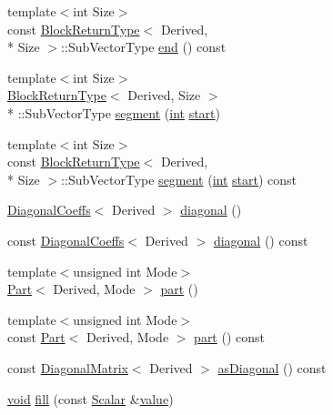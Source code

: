 \begin{DoxyCompactItemize}
\item 
{\footnotesize template$<$int Size$>$ }\\const \hyperlink{struct_block_return_type}{Block\-Return\-Type}$<$ Derived, \\*
Size $>$\-::Sub\-Vector\-Type \hyperlink{class_matrix_base_a66719213d51d4794bd0245740b1d8588}{end} () const 
\item 
{\footnotesize template$<$int Size$>$ }\\\hyperlink{struct_block_return_type}{Block\-Return\-Type}$<$ Derived, Size $>$\\*
\-::Sub\-Vector\-Type \hyperlink{class_matrix_base_a2531b5529eeddd274b4d51ecc45c0691}{segment} (\hyperlink{ioapi_8h_a787fa3cf048117ba7123753c1e74fcd6}{int} \hyperlink{glext_8h_a13be19455586e95d5a42ed8f054afad2}{start})
\item 
{\footnotesize template$<$int Size$>$ }\\const \hyperlink{struct_block_return_type}{Block\-Return\-Type}$<$ Derived, \\*
Size $>$\-::Sub\-Vector\-Type \hyperlink{class_matrix_base_aff2b2f9e500eca5b9b9fcde2a9b5e88a}{segment} (\hyperlink{ioapi_8h_a787fa3cf048117ba7123753c1e74fcd6}{int} \hyperlink{glext_8h_a13be19455586e95d5a42ed8f054afad2}{start}) const 
\item 
\hyperlink{class_diagonal_coeffs}{Diagonal\-Coeffs}$<$ Derived $>$ \hyperlink{class_matrix_base_a75bd6c829a7db9a2e9071b5e5e520847}{diagonal} ()
\item 
const \hyperlink{class_diagonal_coeffs}{Diagonal\-Coeffs}$<$ Derived $>$ \hyperlink{class_matrix_base_aef253368d6250a7b2547db079247f48b}{diagonal} () const 
\item 
{\footnotesize template$<$unsigned int Mode$>$ }\\\hyperlink{class_part}{Part}$<$ Derived, Mode $>$ \hyperlink{class_matrix_base_a2d43a96022ff5bee4b6cf15ce3a63e4a}{part} ()
\item 
{\footnotesize template$<$unsigned int Mode$>$ }\\const \hyperlink{class_part}{Part}$<$ Derived, Mode $>$ \hyperlink{class_matrix_base_ab15fa8964784fbe867a17ee50fc9dd13}{part} () const 
\item 
const \hyperlink{class_diagonal_matrix}{Diagonal\-Matrix}$<$ Derived $>$ \hyperlink{class_matrix_base_a4e36fa049f918a9c39ef748be6009b97}{as\-Diagonal} () const 
\item 
\hyperlink{group___u_a_v_objects_plugin_ga444cf2ff3f0ecbe028adce838d373f5c}{void} \hyperlink{class_matrix_base_ab253f64258fd5ee2b979d853a1fc8a94}{fill} (const \hyperlink{class_matrix_base_a625df8339dc2d816cbc0fd66e7dadaf5}{Scalar} \&\hyperlink{glext_8h_aa0e2e9cea7f208d28acda0480144beb0}{value})

\end{DoxyCompactItemize}
